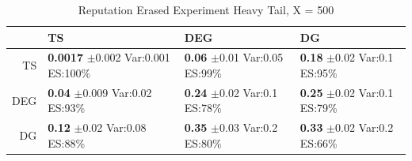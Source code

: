\documentclass[11pt,letterpaper]{article}
\begin{document}
\begin{table}[ht]
\centering
\caption{Reputation Erased Experiment Heavy Tail, X = 500} 
\begin{tabular}{rlll}
  \hline
 & TS & DEG &  DG \\ 
  \hline
TS & \makecell{\textbf{0.0017} $\pm$0.002\\Var:0.001\\ES:100\%} & \makecell{\textbf{0.06} $\pm$0.01\\Var:0.05\\ES:99\%} & \makecell{\textbf{0.18} $\pm$0.02\\Var:0.1\\ES:95\%} \\ 
  DEG & \makecell{\textbf{0.04} $\pm$0.009\\Var:0.02\\ES:93\%} & \makecell{\textbf{0.24} $\pm$0.02\\Var:0.1\\ES:78\%} & \makecell{\textbf{0.25} $\pm$0.02\\Var:0.1\\ES:79\%} \\ 
   DG & \makecell{\textbf{0.12} $\pm$0.02\\Var:0.08\\ES:88\%} & \makecell{\textbf{0.35} $\pm$0.03\\Var:0.2\\ES:80\%} & \makecell{\textbf{0.33} $\pm$0.02\\Var:0.2\\ES:66\%} \\ 
   \hline
\end{tabular}
\end{table}
\end{document}
